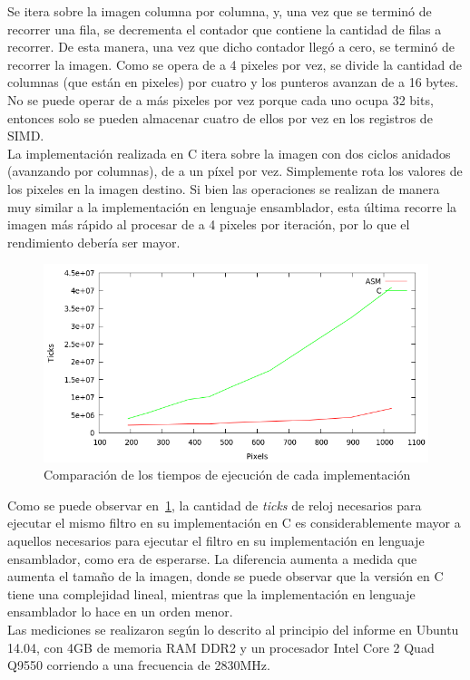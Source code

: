 \documentclass[a4paper]{article}
\begin{document}
Se itera sobre la imagen columna por columna, y, una vez que se terminó de recorrer una fila, se decrementa el contador que contiene la cantidad de filas a recorrer. De esta manera, una vez que dicho contador llegó a cero, se terminó de recorrer la imagen. Como se opera de a 4 pixeles por vez, se divide la cantidad de columnas (que están en pixeles) por cuatro y los punteros avanzan de a 16 bytes. No se puede operar de a más pixeles por vez porque cada uno ocupa 32 bits, entonces solo se pueden almacenar cuatro de ellos por vez en los registros de SIMD.\\


La implementación realizada en C itera sobre la imagen con dos ciclos anidados (avanzando por columnas), de a un píxel por vez. Simplemente rota los valores de los pixeles en la imagen destino. Si bien las operaciones se realizan de manera muy similar a la implementación en lenguaje ensamblador, esta última recorre la imagen más rápido al procesar de a 4 pixeles por iteración, por lo que el rendimiento debería ser mayor.\\

\begin{figure}[H]
  \begin{center}
	\includegraphics[scale=0.77]{imagenes/rotarC.png}
	\caption{Comparación de los tiempos de ejecución de cada implementación}
	\label{rotar_asmvsc}
  \end{center}
\end{figure}

Como se puede observar en~\ref{rotar_asmvsc}, la cantidad de \textit{ticks} de reloj necesarios para ejecutar el mismo filtro en su implementación en C es considerablemente mayor a aquellos necesarios para ejecutar el filtro en su implementación en lenguaje ensamblador, como era de esperarse. La diferencia aumenta a medida que aumenta el tamaño de la imagen, donde se puede observar que la versión en C tiene una complejidad lineal, mientras que la implementación en lenguaje ensamblador lo hace en un orden menor.\\
Las mediciones se realizaron según lo descrito al principio del informe en Ubuntu 14.04, con 4GB de memoria RAM DDR2 y un procesador Intel Core 2 Quad Q9550 corriendo a una frecuencia de 2830MHz.
\end{document}
